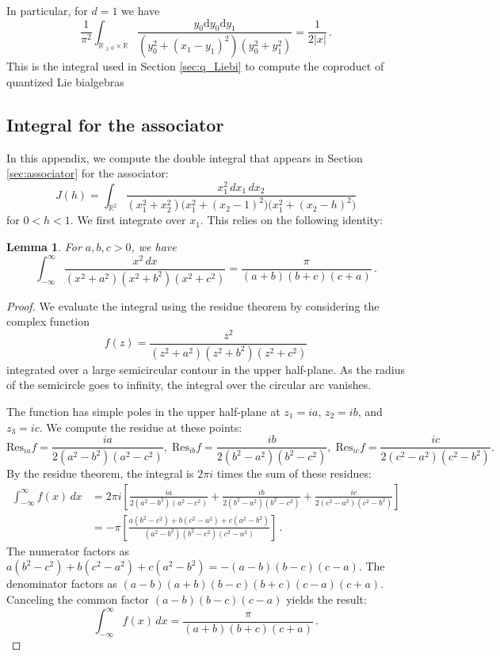 \documentclass[11pt]{article}
\newcommand{\R}{\mathbb{R}}
\newcommand{\ddr}{\mathrm{d}}
\numberwithin{equation}{section}
\newtheorem{lemma}{Lemma}[section]
\begin{document}
In particular, for $d = 1$ we have
\begin{equation}
		\frac{1}{\pi^2}\int_{\R_{\geq0}\times\R}\frac{y_0\ddr y_0\ddr y_1}{(y_0^2+(x_1 - y_1)^2)(y_0^2 + y_1^2)}  = \frac{1}{2|x|}\,.
\end{equation}
This is the integral used in Section \ref{sec:q_Liebi} to compute the coproduct of quantized Lie bialgebras


\subsection{Integral for the associator}
\label{sec:integral_computation}

In this appendix, we compute the double integral that appears in Section \ref{sec:associator} for the associator:
\begin{equation}
J(h) = \int_{\mathbb R^2}\frac{x_1^2\,dx_1\,dx_2} {(x_1^2+x_2^2)\bigl(x_1^2+(x_2-1)^2\bigr)\bigl(x_1^2+(x_2-h)^2\bigr)}
\end{equation}
for $0 < h < 1$. We first integrate over $x_1$. This relies on the following identity:

\begin{lemma}
For $a, b, c > 0$, we have
\begin{equation}
\int_{-\infty}^\infty \frac{x^2\,dx}{(x^2+a^2)(x^2+b^2)(x^2+c^2)} = \frac{\pi}{(a+b)(b+c)(c+a)}\,.
\end{equation}
\end{lemma}
\begin{proof}
We evaluate the integral using the residue theorem by considering the complex function
\[
f(z) = \frac{z^2}{(z^2+a^2)(z^2+b^2)(z^2+c^2)}
\]
integrated over a large semicircular contour in the upper half-plane. As the radius of the semicircle goes to infinity, the integral over the circular arc vanishes. 

The function has simple poles in the upper half-plane at $z_1 = ia$, $z_2 = ib$, and $z_3 = ic$. We compute the residue at these points:
\begin{equation}
	\text{Res}_{ia}f = \frac{ia}{2(a^2-b^2)(a^2-c^2)},\; \text{Res}_{ib}f = \frac{ib}{2(b^2-a^2)(b^2-c^2)}, \; \text{Res}_{ic}f = \frac{ic}{2(c^2-a^2)(c^2-b^2)}.
\end{equation}
By the residue theorem, the integral is $2\pi i$ times the sum of these residues:
\begin{align*}
\int_{-\infty}^\infty f(x)\,dx &= 2\pi i \left[ \frac{ia}{2(a^2-b^2)(a^2-c^2)} + \frac{ib}{2(b^2-a^2)(b^2-c^2)} + \frac{ic}{2(c^2-a^2)(c^2-b^2)} \right] \\
&= -\pi \left[ \frac{a(b^2-c^2) + b(c^2-a^2) + c(a^2-b^2)}{(a^2-b^2)(b^2-c^2)(c^2-a^2)} \right]\,.
\end{align*}
The numerator factors as $a(b^2-c^2) + b(c^2-a^2) + c(a^2-b^2) = -(a-b)(b-c)(c-a)$. The denominator factors as $(a-b)(a+b)(b-c)(b+c)(c-a)(c+a)$. Canceling the common factor $(a-b)(b-c)(c-a)$ yields the result:
\[
\int_{-\infty}^\infty f(x)\,dx = \frac{\pi}{(a+b)(b+c)(c+a)}\,.
\]
\end{proof}
\end{document}

